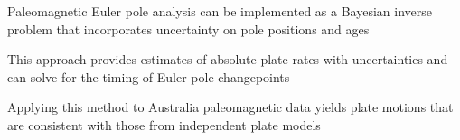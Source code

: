 \documentclass[]{agujournal2019}
\begin{document}




\begin{keypoints}
\item Paleomagnetic Euler pole analysis can be implemented as a Bayesian inverse problem that incorporates uncertainty on pole positions and ages
\item This approach provides estimates of absolute plate rates with uncertainties and can solve for the timing of Euler pole changepoints
\item Applying this method to Australia paleomagnetic data yields plate motions that are consistent with those from independent plate models
\end{keypoints}

%
%

%
%
\end{document}
